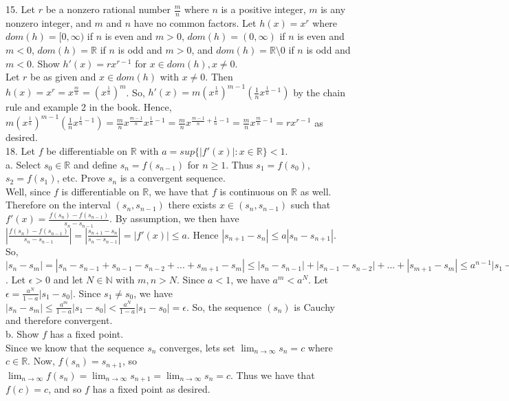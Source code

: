 \documentclass[12pt]{article}
\begin{document}
15. Let $r$ be a nonzero rational number $\frac{m}{n}$ where $n$ is a positive integer, $m$ is any nonzero integer, and $m$ and $n$ have no common factors. Let $h(x)=x^r$ where $dom(h)=[0,\infty)$ if $n$ is even and $m>0$, $dom(h)=(0,\infty)$ if $n$ is even and $m<0$, $dom(h)=\mathbb{R}$ if $n$ is odd and $m>0$, and $dom(h)=\mathbb{R}\setminus{0}$ if $n$ is odd and $m<0$. Show $h'(x) = rx^{r-1}$ for $x\in dom(h), x\neq0$.\\
Let $r$ be as given and $x\in dom(h)$ with $x\neq0$. Then $h(x)=x^r=x^{\frac{m}{n}}=(x^{\frac1n})^m$. So, $h'(x)=m(x^{\frac1n})^{m-1}(\frac1nx^{\frac1n-1})$ by the chain rule and example 2 in the book. Hence, $m(x^{\frac1n})^{m-1}(\frac1nx^{\frac1n-1})=\frac{m}{n}x^{\frac{m-1}{n}}x^{\frac1n-1}=\frac{m}{n}x^{\frac{m-1}{n}+\frac1n-1}=\frac{m}{n}x^{\frac{m}{n}-1}=rx^{r-1}$ as desired.\\[20pt]

18. Let $f$ be differentiable on $\mathbb{R}$ with $a=sup\{|f'(x)|:x\in\mathbb{R}\}<1$.\\
a. Select $s_0\in\mathbb{R}$ and define $s_n=f(s_{n-1})$ for $n\geq1$. Thus $s_1=f(s_0)$, $s_2=f(s_1)$, etc. Prove $s_n$ is a convergent sequence.\\
Well, since $f$ is differentiable on $\mathbb{R}$, we have that $f$ is continuous on $\mathbb{R}$ as well. Therefore on the interval $(s_n, s_{n-1})$ there exists $x\in(s_n, s_{n-1})$ such that $f'(x)=\frac{f(s_n)-f(s_{n-1})}{s_n-s_{n-1}}$. By assumption, we then have $|\frac{f(s_n)-f(s_{n-1})}{s_n-s_{n-1}}|=|\frac{s_{n+1}-s_n}{s_n-s_{n-1}}|=|f'(x)|\leq a$. Hence $|s_{n+1}-s_n|\leq a|s_n-s_{n+1}|$. So, $|s_n-s_m|=|s_n-s_{n-1}+s_{n-1}-s_{n-2}+...+s_{m+1}-s_m|\leq|s_n-s_{n-1}|+|s_{n-1}-s_{n-2}|+...+|s_{m+1}-s_m|\leq a^{n-1}|s_1-s_0|+a^{n-2}|s_1-s_0|+...+a^m|s_1-s_0|=(a^{n-1}+a^{n-2}+...+a^m)|s_1-s_0|\leq\frac{a^m}{1-a}|s_1-s_0|$. Let $\epsilon>0$ and let $N\in\mathbb{N}$ with $m,n>N$. Since $a<1$, we have $a^m<a^N$. Let $\epsilon=\frac{a^N}{1-a}|s_1-s_0|$. Since $s_1\neq s_0$, we have $|s_n-s_m|\leq\frac{a^m}{1-a}|s_1-s_0|<\frac{a^N}{1-a}|s_1-s_0|=\epsilon$. So, the sequence $(s_n)$ is Cauchy and therefore convergent.\\
b. Show $f$ has a fixed point.\\
Since we know that the sequence $s_n$ converges, lets set $\lim_{n\rightarrow\infty}s_n=c$ where $c\in\mathbb{R}$. Now, $f(s_n)=s_{n+1}$, so $\lim_{n\rightarrow\infty}f(s_n)=\lim_{n\rightarrow\infty}s_{n+1}=\lim_{n\rightarrow\infty}s_n=c$. Thus we have that $f(c)=c$, and so $f$ has a fixed point as desired.\\[20pt]
\end{document}
